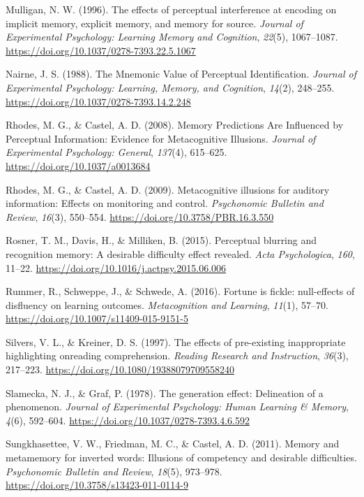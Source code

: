 \documentclass[
  english,
  jou]{apa6}
\begin{document}
\leavevmode\hypertarget{ref-Mulligan1996}{}%
Mulligan, N. W. (1996). The effects of perceptual interference at encoding on implicit memory, explicit memory, and memory for source. \emph{Journal of Experimental Psychology: Learning Memory and Cognition}, \emph{22}(5), 1067--1087. \url{https://doi.org/10.1037/0278-7393.22.5.1067}

\leavevmode\hypertarget{ref-Nairne1988}{}%
Nairne, J. S. (1988). The Mnemonic Value of Perceptual Identification. \emph{Journal of Experimental Psychology: Learning, Memory, and Cognition}, \emph{14}(2), 248--255. \url{https://doi.org/10.1037/0278-7393.14.2.248}

\leavevmode\hypertarget{ref-Rhodes2008}{}%
Rhodes, M. G., \& Castel, A. D. (2008). Memory Predictions Are Influenced by Perceptual Information: Evidence for Metacognitive Illusions. \emph{Journal of Experimental Psychology: General}, \emph{137}(4), 615--625. \url{https://doi.org/10.1037/a0013684}

\leavevmode\hypertarget{ref-Rhodes2009}{}%
Rhodes, M. G., \& Castel, A. D. (2009). Metacognitive illusions for auditory information: Effects on monitoring and control. \emph{Psychonomic Bulletin and Review}, \emph{16}(3), 550--554. \url{https://doi.org/10.3758/PBR.16.3.550}

\leavevmode\hypertarget{ref-Rosner2015}{}%
Rosner, T. M., Davis, H., \& Milliken, B. (2015). Perceptual blurring and recognition memory: A desirable difficulty effect revealed. \emph{Acta Psychologica}, \emph{160}, 11--22. \url{https://doi.org/10.1016/j.actpsy.2015.06.006}

\leavevmode\hypertarget{ref-Rummer2016}{}%
Rummer, R., Schweppe, J., \& Schwede, A. (2016). Fortune is fickle: null-effects of disfluency on learning outcomes. \emph{Metacognition and Learning}, \emph{11}(1), 57--70. \url{https://doi.org/10.1007/s11409-015-9151-5}

\leavevmode\hypertarget{ref-Silvers1997}{}%
Silvers, V. L., \& Kreiner, D. S. (1997). The effects of pre-existing inappropriate highlighting onreading comprehension. \emph{Reading Research and Instruction}, \emph{36}(3), 217--223. \url{https://doi.org/10.1080/19388079709558240}

\leavevmode\hypertarget{ref-Slamecka1978}{}%
Slamecka, N. J., \& Graf, P. (1978). The generation effect: Delineation of a phenomenon. \emph{Journal of Experimental Psychology: Human Learning \& Memory}, \emph{4}(6), 592--604. \url{https://doi.org/10.1037/0278-7393.4.6.592}

\leavevmode\hypertarget{ref-Sungkhasettee2011}{}%
Sungkhasettee, V. W., Friedman, M. C., \& Castel, A. D. (2011). Memory and metamemory for inverted words: Illusions of competency and desirable difficulties. \emph{Psychonomic Bulletin and Review}, \emph{18}(5), 973--978. \url{https://doi.org/10.3758/s13423-011-0114-9}
\end{document}
